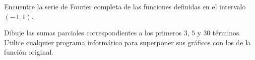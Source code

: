 \question

Encuentre la serie de Fourier completa de las funciones definidas en
el intervalo $\left(-1,1\right)$.

\begin{multicols}{2}
\end{multicols}

Dibuje las sumas parciales correspondientes a los primeros $3$, $5$ y
$30$ términos.
Utilice cualquier programa informático para superponer sus gráficos
con los de la función original.

\question

